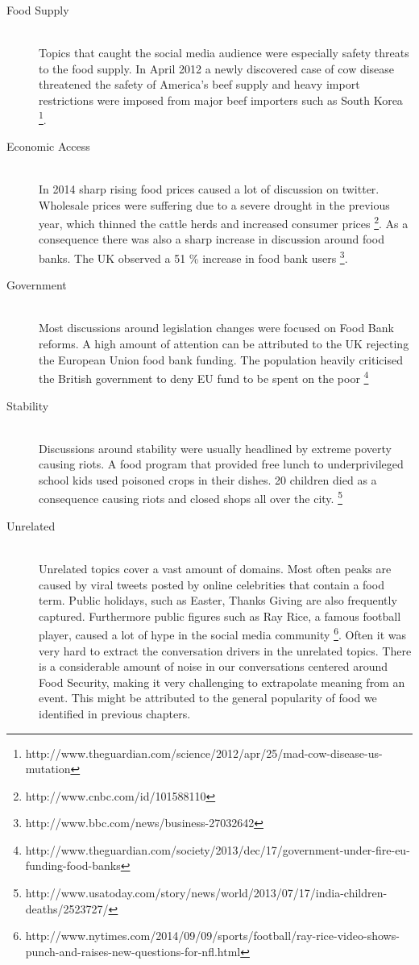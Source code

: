 \begin{description}
  \item[Food Supply ] \hfill \\
 Topics that caught the social media audience were especially safety threats to the food supply. In April 2012 a newly discovered case of cow disease threatened the safety of America's beef supply and heavy import restrictions were imposed from major beef importers such as South Korea \footnote{http://www.theguardian.com/science/2012/apr/25/mad-cow-disease-us-mutation}.
  \item[Economic Access] \hfill \\
  In 2014 sharp rising food prices caused a lot of discussion on twitter. Wholesale prices were suffering due to a severe drought in the previous year, which thinned the cattle herds and increased consumer prices \footnote{http://www.cnbc.com/id/101588110}. As a consequence there was also a sharp increase in discussion around food banks. The UK observed a 51 \% increase in food bank users \footnote{http://www.bbc.com/news/business-27032642}. 
  \item[Government] \hfill \\
  Most discussions around legislation changes were focused on Food Bank reforms. A high amount of attention can be attributed to the UK rejecting the European Union food bank funding. The population heavily criticised the British government to deny EU fund to be spent on the poor \footnote{http://www.theguardian.com/society/2013/dec/17/government-under-fire-eu-funding-food-banks}
    \item[Stability] \hfill \\
  Discussions around stability were usually headlined by extreme poverty causing riots. A food program that provided free lunch to underprivileged school kids used poisoned crops in their dishes. 20 children died as a consequence causing riots and closed shops all over the city. \footnote{http://www.usatoday.com/story/news/world/2013/07/17/india-children-deaths/2523727/}
   \item[Unrelated] \hfill \\
   Unrelated topics cover a vast amount of domains. Most often peaks are caused by viral tweets posted by online celebrities that contain a food term. Public holidays, such as Easter, Thanks Giving are also frequently captured. Furthermore public figures such as Ray Rice, a famous football player, caused a lot of hype in the social media community \footnote{http://www.nytimes.com/2014/09/09/sports/football/ray-rice-video-shows-punch-and-raises-new-questions-for-nfl.html}. Often it was very hard to extract the conversation drivers in the unrelated topics. There is a considerable amount of noise in our conversations centered around Food Security, making it very challenging to extrapolate meaning from an event. This might be attributed to the general popularity of food we identified in previous chapters. 

\end{description}




